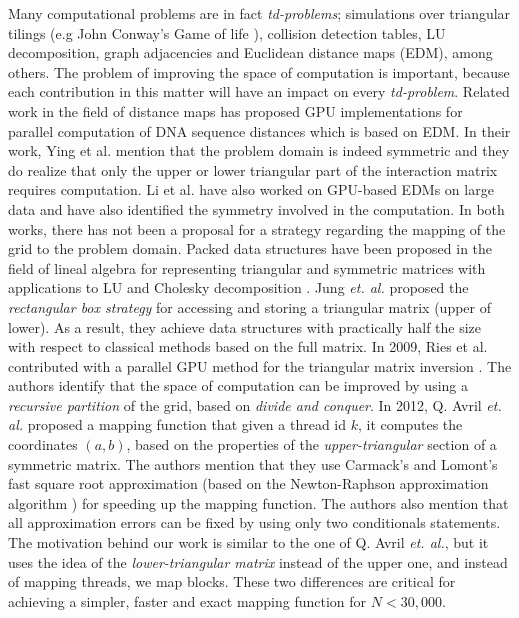 \documentclass[conference]{IEEEtran}
\begin{document}
Many computational problems are in fact \textit{td-problems}; 
simulations over triangular tilings (e.g John Conway's Game of life \cite{ConwaysLife}), collision detection tables, LU decomposition, 
graph adjacencies and Euclidean distance maps (EDM), among others. The problem of improving the space of computation is important, 
because each contribution in this matter will have an impact on every \textit{td-problem}.
Related work in the field of distance maps has proposed GPU implementations for parallel computation of DNA sequence distances \cite{Ying:2011:GDD:2065356.2065583} which 
is based on EDM. In their work, Ying et al. mention that the problem domain is indeed symmetric and they do realize that only 
the upper or lower triangular part of the interaction matrix requires computation. Li et al. \cite{Li:2010:CME:1955604.1956601}
have also worked on GPU-based EDMs on large data and have also identified the symmetry involved in the computation. 
In both works, there has not been a proposal for a strategy regarding the mapping of the grid to the problem domain. 
Packed data structures have been proposed in the field of lineal algebra for representing triangular and symmetric matrices 
with applications to LU and Cholesky decomposition \cite{springerlink_gustavson}. Jung \textit{et. al.} \cite{Jung2008} proposed the \textit{rectangular box strategy} 
for accessing and storing a triangular matrix (upper of lower). 
As a result, they achieve data structures with practically half the size with respect to classical methods based on the full matrix. 
In 2009, Ries et al. contributed with a parallel GPU method for the triangular matrix inversion \cite{Ries:2009:TMI:1654059.1654069}. 
The authors identify that the space of computation can be improved by using a \textit{recursive partition} of the grid, based on \textit{divide and conquer}. 
In 2012, Q. Avril \textit{et. al.} \cite{AvrilGA12} proposed 
a mapping function that given a thread id $k$, it computes the coordinates $(a, b)$, based on the properties of 
the \textit{upper-triangular} section of a symmetric matrix. The authors mention that they use Carmack's and Lomont's 
fast square root approximation (based on the Newton-Raphson approximation algorithm \cite{Peelle:1974:TNS:585882.585889}) for speeding up the mapping function. The authors 
also mention that all approximation errors can be fixed by using only two conditionals statements. 
The motivation behind our work is similar to the one of Q. Avril \textit{et. al.}, but it uses the idea of the \textit{lower-triangular matrix} instead of the upper one, 
and instead of mapping threads, we map blocks. These two differences are critical for achieving a simpler, 
faster and exact mapping function for $N < 30,000$. 
\end{document}
